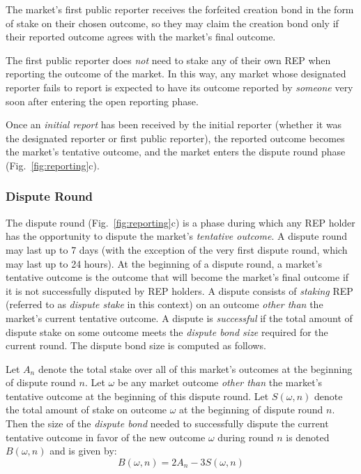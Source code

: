 \documentclass[floatfix,reprint,nofootinbib,amsmath,amssymb,epsfig,pre,floats,letterpaper,groupedaffiliation]{revtex4-1}
\newcommand{\beq}{\begin{equation}}
\newcommand{\eeq}{\end{equation}}
\theoremstyle{definition}
\theoremstyle{definition}
\begin{document}
The market's first public reporter receives the forfeited creation bond in the form of stake on their chosen outcome, so they may claim the creation bond only if their reported outcome agrees with the market's final outcome.

The first public reporter does \textit{not} need to stake any of their own REP when reporting the outcome of the market.  In this way, any market whose designated reporter fails to report is expected to have its outcome reported by \textit{someone} very soon after entering the open reporting phase.

Once an \textit{initial report} has been received by the initial reporter (whether it was the designated reporter or first public reporter), the reported outcome becomes the market's tentative outcome, and the market enters the dispute round phase (Fig.~\ref{fig:reporting}c).

\subsubsection{Dispute Round}

The dispute round (Fig.~\ref{fig:reporting}c) is a phase during which any REP holder has the opportunity to dispute the market's \textit{tentative outcome}. A dispute round may last up to 7 days (with the exception of the very first dispute round, which may last up to 24 hours). At the beginning of a dispute round, a market's tentative outcome is the outcome that will become the market's final outcome if it is not successfully disputed by REP holders. A dispute consists of \textit{staking} REP (referred to as \textit{dispute stake} in this context) on an outcome \textit{other than} the market's current tentative outcome.  A dispute is \textit{successful} if the total amount of dispute stake on some outcome meets the \textit{dispute bond size} required for the current round.  The dispute bond size is computed as follows.

Let $A_n$ denote the total stake over all of this market's outcomes at the beginning of dispute round $n$.  Let $\omega$ be any market outcome \textit{other than} the market's tentative outcome at the beginning of this dispute round.  Let $S(\omega, n)$ denote the total amount of stake on outcome $\omega$ at the beginning of dispute round $n$.  Then the size of the \textit{dispute bond} needed to successfully dispute the current tentative outcome in favor of the new outcome $\omega$ during round $n$ is denoted $B(\omega, n)$ and is given by:
\beq \label{eq:bond_size}
B(\omega, n) = 2A_n - 3S(\omega, n)
\eeq
\end{document}
